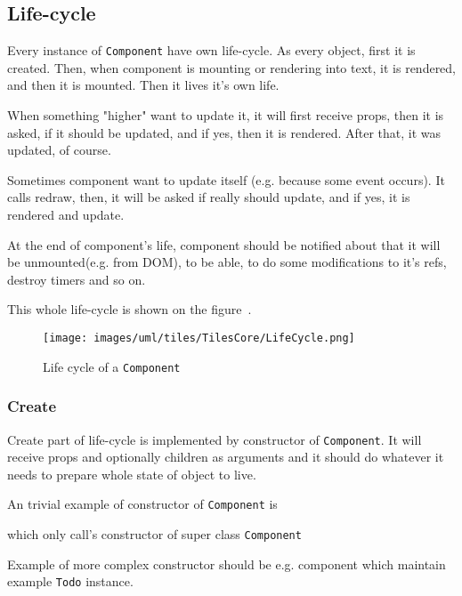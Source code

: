   \subsection{Life-cycle}\label{subsec:our-architecture-lifecycle}

    Every instance of \texttt{Component} have own life-cycle. 
    As every object, first it is created. 
    Then, when component is mounting or rendering into text, it is rendered, and then it is mounted.
    Then it lives it's own life. 

    When something "higher" want to update it, it will first receive props, 
    then it is asked, if it should be updated, and if yes, then it is rendered.
    After that, it was updated, of course.

    Sometimes component want to update itself (e.g. because some event occurs).
    It calls redraw, then, it will be asked if really should update, and if yes, it is rendered and update.

    At the end of component's life, 
    component should be notified about that it will be unmounted(e.g. from DOM), 
    to be able, to do some modifications to it's refs, destroy timers and so on. 

    This whole life-cycle is shown on the figure~.

    \begin{figure}[h]
    \centering  
      \texttt{[image: images/uml/tiles/TilesCore/LifeCycle.png]}
      \caption{Life cycle of a \texttt{Component}}
      \label{img:our-life-cycle}
    \end{figure}

    \subsubsection{Create}\label{subsec:our-architecture-lifecycle-create}

      Create part of life-cycle is implemented by constructor of \texttt{Component}. 
      It will receive props and optionally children as arguments and 
      it should do whatever it needs to prepare whole state of object to live.

      An trivial example of constructor of \texttt{Component} is 
      
      which only call's constructor of super class \texttt{Component}

      Example of more complex constructor should be e.g. component 
      which maintain example \texttt{Todo} instance.
      

